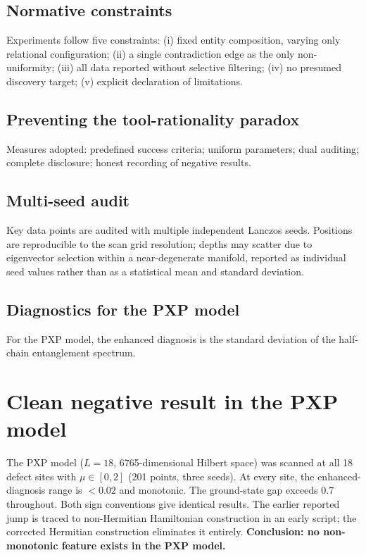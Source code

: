 \documentclass[aps,prb,reprint,superscriptaddress]{revtex4-2}
\begin{document}
\subsection{Normative constraints}

Experiments follow five constraints: (i) fixed entity composition, varying only relational configuration; (ii) a single contradiction edge as the only non-uniformity; (iii) all data reported without selective filtering; (iv) no presumed discovery target; (v) explicit declaration of limitations.

\subsection{Preventing the tool-rationality paradox}

Measures adopted: predefined success criteria; uniform parameters; dual auditing; complete disclosure; honest recording of negative results.

\subsection{Multi-seed audit}

Key data points are audited with multiple independent Lanczos seeds. Positions are reproducible to the scan grid resolution; depths may scatter due to eigenvector selection within a near-degenerate manifold, reported as individual seed values rather than as a statistical mean and standard deviation.

\subsection{Diagnostics for the PXP model}

For the PXP model, the enhanced diagnosis is the standard deviation of the half-chain entanglement spectrum.

\section{Clean negative result in the PXP model}

The PXP model ($L=18$, 6765-dimensional Hilbert space) was scanned at all 18 defect sites with $\mu\in[0,2]$ (201 points, three seeds). At every site, the enhanced-diagnosis range is $<0.02$ and monotonic. The ground-state gap exceeds $0.7$ throughout. Both sign conventions give identical results. The earlier reported jump is traced to non-Hermitian Hamiltonian construction in an early script; the corrected Hermitian construction eliminates it entirely. \textbf{Conclusion: no non-monotonic feature exists in the PXP model.}
\end{document}
